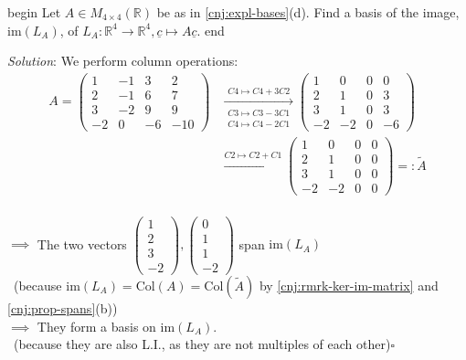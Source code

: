 \documentclass[
  12pt,
  a4paper,
  twoside]{article}
\theoremstyle{plain}
\theoremstyle{definition}
\begin{document}
\csname begin\label{cnj:expl-basis-im}
Let \(A \in M_{4 \times 4}(\mathbb{R})\) be as in \ref{cnj:expl-bases}(d). Find a basis of the image, \(\mathrm{im}(L_{A})\), of \(L_{A} : \mathbb{R}^{4} \to \mathbb{R}^{4}, \underline{c} \mapsto A \underline{c}\).
\csname end

\emph{Solution}: We perform column operations:
\begin{align*}
A =
\begin{pmatrix} 1 & -1 & 3 & 2 \\ 2 & -1 & 6 & 7 \\ 3 & -2 & 9 & 9 \\ -2 & 0 & -6 & -10 \end{pmatrix}
& \xrightarrow[\substack{C3 \mapsto C3 - 3C1 \\ C4 \mapsto C4 - 2C1}]{C4 \mapsto C4 + 3C2}
\begin{pmatrix} 1 & 0 & 0 & 0 \\ 2 & 1 & 0 & 3 \\ 3 & 1 & 0 & 3 \\ -2 & -2 & 0 & -6 \end{pmatrix}
\\
& \xrightarrow{C2 \mapsto C2 + C1}
\begin{pmatrix} 1 & 0 & 0 & 0 \\ 2 & 1 & 0 & 0 \\ 3 & 1 & 0 & 0 \\ -2 & -2 & 0 & 0 \end{pmatrix} =: \widetilde{A}
\end{align*}\\
\(\implies\) The two vectors \(\begin{pmatrix} 1 \\ 2 \\ 3 \\ -2 \end{pmatrix}, \begin{pmatrix} 0 \\ 1 \\ 1 \\ -2 \end{pmatrix}\) span \(\mathrm{im}(L_{A})\)\\
\hspace*{0.333em}\hfill~{(because \(\mathrm{im}(L_{A}) = \mathrm{Col}(A) = \mathrm{Col}(\tilde{A})\) by \ref{cnj:rmrk-ker-im-matrix} and \ref{cnj:prop-spans}(b))}\\
\(\implies\) They form a basis on \(\mathrm{im}(L_A)\).\\
\hspace*{0.333em}\hfill~{(because they are also L.I., as they are not multiples of each other)\(\square\)}
\end{document}
